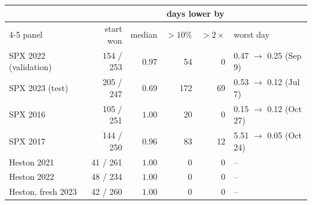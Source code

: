 \begin{tabular}{lrrrrl}
\toprule
& & & \multicolumn{2}{c}{days lower by} & \\
\cmidrule(lr){4-5}
panel & start won & median & $>10\%$ & $>2\times$ & worst day \\
\midrule
SPX 2022 (validation) & 154 / 253 & $0.97$ & 54 & 0 & 0.47 $\to$ 0.25 (Sep 9) \\
SPX 2023 (test) & 205 / 247 & $0.69$ & 172 & 69 & 0.53 $\to$ 0.12 (Jul 7) \\
SPX 2016 & 105 / 251 & $1.00$ & 20 & 0 & 0.15 $\to$ 0.12 (Oct 27) \\
SPX 2017 & 144 / 250 & $0.96$ & 83 & 12 & 5.51 $\to$ 0.05 (Oct 24) \\
Heston 2021 & 41 / 261 & $1.00$ & 0 & 0 & -- \\
Heston 2022 & 48 / 234 & $1.00$ & 0 & 0 & -- \\
Heston, fresh 2023 & 42 / 260 & $1.00$ & 0 & 0 & -- \\
\bottomrule
\end{tabular}
